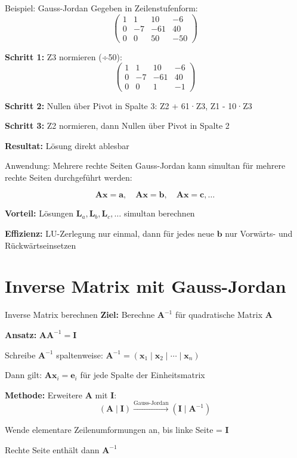 \documentclass[a4paper, fontsize=7pt]{scrartcl}
\begin{document}
\begin{subbox}{Beispiel: Gauss-Jordan}
Gegeben in Zeilenstufenform:
$$\left(\begin{array}{ccc|c}
1 & 1 & 10 & -6 \\
0 & -7 & -61 & 40 \\
0 & 0 & 50 & -50
\end{array}\right)$$

\textbf{Schritt 1:} Z3 normieren (÷50):
$$\left(\begin{array}{ccc|c}
1 & 1 & 10 & -6 \\
0 & -7 & -61 & 40 \\
0 & 0 & 1 & -1
\end{array}\right)$$

\textbf{Schritt 2:} Nullen über Pivot in Spalte 3:
Z2 + 61·Z3, Z1 - 10·Z3

\textbf{Schritt 3:} Z2 normieren, dann Nullen über Pivot in Spalte 2

\textbf{Resultat:} Lösung direkt ablesbar
\end{subbox}

\begin{mainbox}{Anwendung: Mehrere rechte Seiten}
Gauss-Jordan kann simultan für mehrere rechte Seiten durchgeführt werden:

$$\mathbf{Ax} = \mathbf{a}, \quad \mathbf{Ax} = \mathbf{b}, \quad \mathbf{Ax} = \mathbf{c}, \ldots$$

\textbf{Vorteil:} Lösungen $\mathbf{L}_a, \mathbf{L}_b, \mathbf{L}_c, \ldots$ simultan berechnen

\textbf{Effizienz:} LU-Zerlegung nur einmal, dann für jedes neue $\mathbf{b}$ nur Vorwärts- und Rückwärtseinsetzen
\end{mainbox}

\section{Inverse Matrix mit Gauss-Jordan}

\begin{mainbox}{Inverse Matrix berechnen}
\textbf{Ziel:} Berechne $\mathbf{A}^{-1}$ für quadratische Matrix $\mathbf{A}$

\textbf{Ansatz:} $\mathbf{A}\mathbf{A}^{-1} = \mathbf{I}$

Schreibe $\mathbf{A}^{-1}$ spaltenweise: $\mathbf{A}^{-1} = (\mathbf{x}_1 \mid \mathbf{x}_2 \mid \cdots \mid \mathbf{x}_n)$

Dann gilt: $\mathbf{A}\mathbf{x}_i = \mathbf{e}_i$ für jede Spalte der Einheitsmatrix

\textbf{Methode:} Erweitere $\mathbf{A}$ mit $\mathbf{I}$:
$$(\mathbf{A} \mid \mathbf{I}) \xrightarrow{\text{Gauss-Jordan}} (\mathbf{I} \mid \mathbf{A}^{-1})$$

Wende elementare Zeilenumformungen an, bis linke Seite = $\mathbf{I}$

Rechte Seite enthält dann $\mathbf{A}^{-1}$
\end{mainbox}
\end{document}
